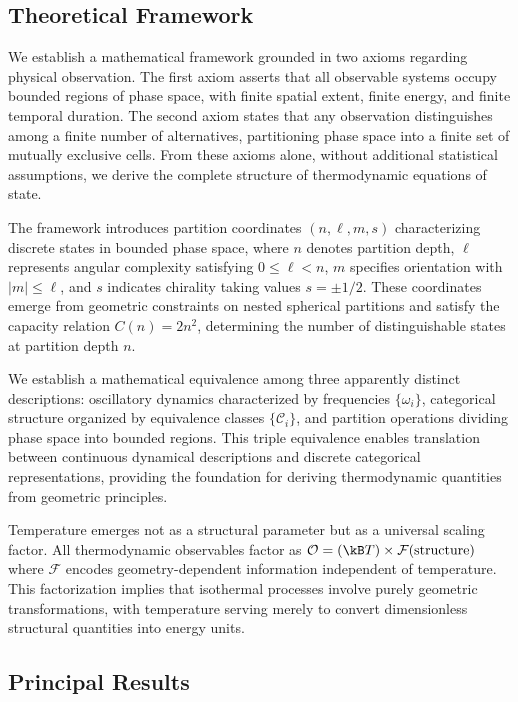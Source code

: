 \subsection{Theoretical Framework}

We establish a mathematical framework grounded in two axioms regarding physical observation. The first axiom asserts that all observable systems occupy bounded regions of phase space, with finite spatial extent, finite energy, and finite temporal duration. The second axiom states that any observation distinguishes among a finite number of alternatives, partitioning phase space into a finite set of mutually exclusive cells. From these axioms alone, without additional statistical assumptions, we derive the complete structure of thermodynamic equations of state.

The framework introduces partition coordinates $(n,\ell,m,s)$ characterizing discrete states in bounded phase space, where $n$ denotes partition depth, $\ell$ represents angular complexity satisfying $0 \leq \ell < n$, $m$ specifies orientation with $|m| \leq \ell$, and $s$ indicates chirality taking values $s = \pm 1/2$. These coordinates emerge from geometric constraints on nested spherical partitions and satisfy the capacity relation $C(n) = 2n^2$, determining the number of distinguishable states at partition depth $n$.

We establish a mathematical equivalence among three apparently distinct descriptions: oscillatory dynamics characterized by frequencies $\{\omega_i\}$, categorical structure organized by equivalence classes $\{\mathcal{C}_i\}$, and partition operations dividing phase space into bounded regions. This triple equivalence enables translation between continuous dynamical descriptions and discrete categorical representations, providing the foundation for deriving thermodynamic quantities from geometric principles.

Temperature emerges not as a structural parameter but as a universal scaling factor. All thermodynamic observables factor as $\mathcal{O} = (\kB T) \times \mathcal{F}(\text{structure})$ where $\mathcal{F}$ encodes geometry-dependent information independent of temperature. This factorization implies that isothermal processes involve purely geometric transformations, with temperature serving merely to convert dimensionless structural quantities into energy units.

\subsection{Principal Results}

